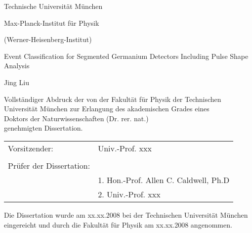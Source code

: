 
\begin{titlepage}

\centering

\vspace{1.0cm}

\begin{center}

{\Huge Technische Universit\"at M\"unchen}

\vspace{1.5 cm}

{\Large Max-Planck-Institut f\"ur Physik \\}

\vspace{0.5 cm} 

{\Large (Werner-Heisenberg-Institut)} 

\vspace{1.5 cm}

{\Large Event Classification for Segmented Germanium Detectors
  Including Pulse Shape Analysis}

\vspace{1.5 cm}

{\Large Jing Liu\\}

\end{center} 

\vspace{1.5 cm}

\begin{center}
Vollst\"andiger Abdruck der von der Fakult\"at f\"ur Physik der
Technischen Universit\"at M\"unchen zur Erlangung des akademischen
Grades eines \\Doktors der Naturwissenschaften (Dr. rer. nat.) \\ 
genehmigten Dissertation. \\
\end{center}

\vspace{1.5 cm} 

\begin{table*}[h]
\center
\begin{tabular}{ll}
Vorsitzender: & \phantom{1.} Univ.-Prof. xxx\\ 
& \\ 
Pr\"ufer der Dissertation: & \\ 
& 1. Hon.-Prof. Allen C. Caldwell, Ph.D \\ 
& 2. Univ.-Prof. xxx \\ 
\end{tabular}
\end{table*}

\vspace{2.0 cm} 

\begin{center}
Die Dissertation wurde am xx.xx.2008 bei der Technischen Universit\"at
M\"unchen eingereicht und durch die Fakult\"at f\"ur Physik am
xx.xx.2008 angenommen. \\
\end{center}

\end{titlepage} 

